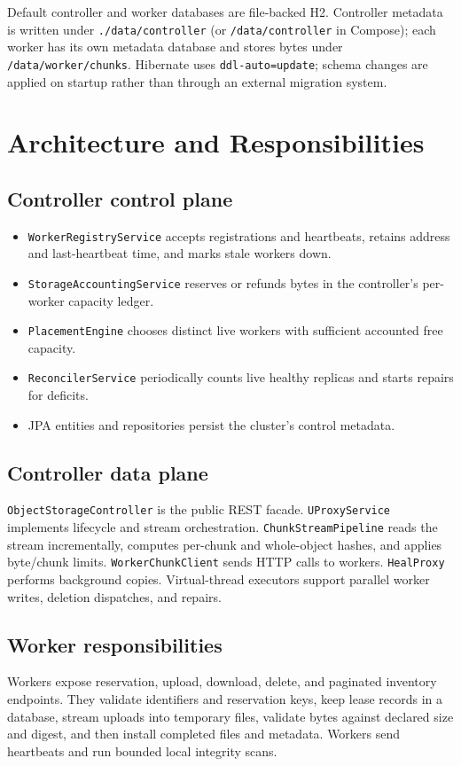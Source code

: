\documentclass[11pt,a4paper]{article}
\begin{document}
Default controller and worker databases are file-backed H2. Controller metadata is written under \texttt{./data/controller} (or \texttt{/data/controller} in Compose); each worker has its own metadata database and stores bytes under \texttt{/data/worker/chunks}. Hibernate uses \texttt{ddl-auto=update}; schema changes are applied on startup rather than through an external migration system.

\section{Architecture and Responsibilities}
\subsection{Controller control plane}
\begin{itemize}
\item \texttt{WorkerRegistryService} accepts registrations and heartbeats, retains address and last-heartbeat time, and marks stale workers down.
\item \texttt{StorageAccountingService} reserves or refunds bytes in the controller's per-worker capacity ledger.
\item \texttt{PlacementEngine} chooses distinct live workers with sufficient accounted free capacity.
\item \texttt{ReconcilerService} periodically counts live healthy replicas and starts repairs for deficits.
\item JPA entities and repositories persist the cluster's control metadata.
\end{itemize}
\subsection{Controller data plane}
\texttt{ObjectStorageController} is the public REST facade. \texttt{UProxyService} implements lifecycle and stream orchestration. \texttt{ChunkStreamPipeline} reads the stream incrementally, computes per-chunk and whole-object hashes, and applies byte/chunk limits. \texttt{WorkerChunkClient} sends HTTP calls to workers. \texttt{HealProxy} performs background copies. Virtual-thread executors support parallel worker writes, deletion dispatches, and repairs.
\subsection{Worker responsibilities}
Workers expose reservation, upload, download, delete, and paginated inventory endpoints. They validate identifiers and reservation keys, keep lease records in a database, stream uploads into temporary files, validate bytes against declared size and digest, and then install completed files and metadata. Workers send heartbeats and run bounded local integrity scans.
\end{document}
